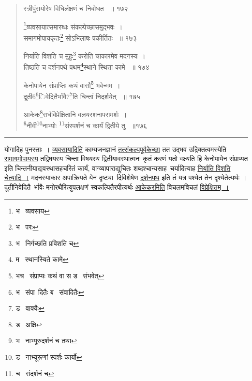 \documentclass[11pt, openany]{book}
\begin{document}
 
\newpage

\begin{quote}
 {\na स्त्रीपुंसयोरेष विधिर्लक्षणं च निबोधत ~॥ १७२ 

\renewcommand{\thefootnote}{1}\footnote{भ \textendash\ व्यवसाय}व्यवसायात्समारब्धः संकल्पेच्छासमुद्भवः~। \\
समागमोपायकृतः\renewcommand{\thefootnote}{2}\footnote{भ \textendash\ परः } सोऽभिलाषः प्रकीर्तितः ~॥ १७३ 

निर्याति विशति च मुहुः\renewcommand{\thefootnote}{3}\footnote{भ \textendash\ निर्गच्छति प्रविशति च } करोति चाकारमेव मदनस्य~। \\
तिष्ठति च दर्शनपथे प्रथम\renewcommand{\thefootnote}{4}\footnote{म \textendash\ स्थानस्यिते कामे}स्थाने स्थिता कामे ~॥ १७४ 

केनोपायेन संप्राप्तिः कथं वासौ\renewcommand{\thefootnote}{5}\footnote{भच \textendash\ संप्राप्यः कथं वा स ड \textendash\ संभवेत्} भवेन्मम~।\\ 
दूती6\renewcommand{\thefootnote}{6}\footnote{भ \textendash\ संपा\textendash\ दितैः ब \textendash\ संवादितैः}िवेदितैर्भावै7\renewcommand{\thefootnote}{7}\footnote{ड \textendash\ वाक्यैः}ति चिन्तां निदर्शयेत् ~॥ १७५ 

आकेक\renewcommand{\thefootnote}{8}\footnote{ड \textendash\ अक्षि}रार्धविप्रेक्षितानि वलयरशनापरामर्शः~।\\ 
\renewcommand{\thefootnote}{9}\footnote{भ \textendash\ नाभ्यूरुदर्शनं च तथा }नीवी\renewcommand{\thefootnote}{10}\footnote{ड \textendash\ नाभ्यूरूणां स्पर्शः कार्यो }नाभ्योः \renewcommand{\thefootnote}{11}\footnote{च \textendash\ संदर्शनं च }संस्पर्शनं च कार्यं द्वितीये तु ~॥१७६ }
\end{quote}

\hrule

\vspace{2mm}

\begin{sloppypar}
\noindent
योगादिह पुनस्ताः~। \underline{व्यवसायादिति} काम्यजनज्ञानं \underline{तत्संकल्पपूर्वकेच्छा} तत उद्भव उद्रिक्तत्वमस्येति \underline{समागमोपायस्य} तद्विषयस्य चिन्ता विषयस्य द्वितीयावस्थात्मनः कृतं करणं यतो वक्ष्यति हि केनोपायेन संप्राप्यत इति चिन्तनीयाद्यवस्थासहचरितं कार्यं, वाग्व्यापाराद्युचितः शब्दश्चान्यसाह\textendash\ चर्यादित्याह \underline{निर्याति विशति चेत्यादि~।} मदनस्याकार अपाक्रियते येन दृष्ट्या\textendash\ दिविशेषेण \underline{दर्शनपथ} इति तं यत्र पश्येत तेन दृश्येतेत्यर्थः~। दूतीनिवेदितै\textendash\ र्भावैः मनोरथैरित्युपलक्षणं स्वकल्पितैरपीत्यर्थः \underline{आकेकरमिति} विचलमविचलं \underline{विप्रेक्षितम्~। }
\end{sloppypar}
\end{document}
